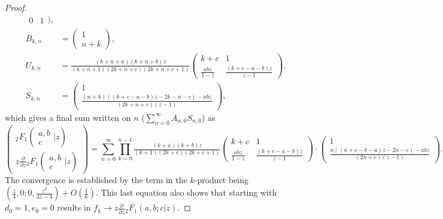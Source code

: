 \documentclass[12pt]{article}
\numberwithin{equation}{section}
\newcommand{\Head}[3] {{}_{#1}{#2}_{#3}}
\newcommand{\ArgS}[3] {( \begin{smallmatrix} #1 \\ #2 \end{smallmatrix} | {#3})}
\begin{document}
\begin{proof}
\begin{align*}
\begin{smallmatrix}
0 & 1
\end{smallmatrix})\text{,}\\
B_{k,n} &= (\begin{smallmatrix}
1 \\
n+k
\end{smallmatrix})\text{,}\\
U_{k,n} &= \tfrac{(k+n+a)(k+n+b)z}{(k+n+1)(2k+n+c)(2k+n+c+1)}
\left(\begin{smallmatrix}
k+c & 1 \\
\tfrac{a b z}{1-z} & \tfrac{(k+c-a-b)z}{z-1}
\end{smallmatrix}\right)\text{,}\\
S_{k,n} &= \left(\begin{smallmatrix}
1 \\
\tfrac{(n+k)((k+c-a-b)z-2k-n-c)-a b z}{(2k+n+c)(z-1)}
\end{smallmatrix}\right)\text{,}
\end{align*}
which gives a final sum written on $n$ ($\sum_{n=0}^{\infty} A_{n,0}S_{n,0}$) as
\begin{equation*}
\begin{pmatrix}
\Head{2}{F}{1} \ArgS{a,b}{c}{z} \\ z \frac{\partial}{\partial z} \Head{2}{F}{1}\ArgS{a,b}{c}{z}
\end{pmatrix} = \sum_{n=0}^{\infty}
\prod_{k=0}^{n-1}
\tfrac{(k+a)(k+b)z}{(k+1)(2k+c)(2k+c+1)}
\left(\begin{smallmatrix}
k+c & 1 \\
\tfrac{a b z}{1-z} & \tfrac{(k+c-a-b)z}{z-1}
\end{smallmatrix}\right)
\cdot \left(\begin{smallmatrix}
1 \\
\tfrac{n((n+c-b-a)z-2n-c)-a b z}{(2n+c)(z-1)}
\end{smallmatrix}\right)\text{.}
\end{equation*}
The convergence is established by the term in the $k$-product being $(\frac{z}{4}, 0; 0,\frac{z^2}{4z-4})+ O(\frac{1}{k})$. This last equation also shows that starting with $d_0=1, e_0=0$ results in $f_k \to z \frac{\partial}{\partial z} \Head{2}{F}{1}(a,b;c|z)$.
\end{proof}
\end{document}
